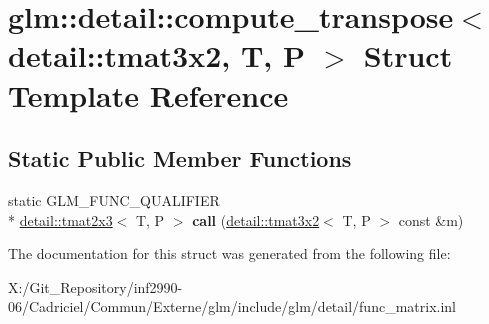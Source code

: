 \hypertarget{structglm_1_1detail_1_1compute__transpose_3_01detail_1_1tmat3x2_00_01_t_00_01_p_01_4}{\section{glm\-:\-:detail\-:\-:compute\-\_\-transpose$<$ detail\-:\-:tmat3x2, T, P $>$ Struct Template Reference}
\label{structglm_1_1detail_1_1compute__transpose_3_01detail_1_1tmat3x2_00_01_t_00_01_p_01_4}
}
\subsection*{Static Public Member Functions}
\begin{DoxyCompactItemize}
\item 
\hypertarget{structglm_1_1detail_1_1compute__transpose_3_01detail_1_1tmat3x2_00_01_t_00_01_p_01_4_a0a30f21e987d479af32a28eb6aeb5def}{static G\-L\-M\-\_\-\-F\-U\-N\-C\-\_\-\-Q\-U\-A\-L\-I\-F\-I\-E\-R \\*
\hyperlink{structglm_1_1detail_1_1tmat2x3}{detail\-::tmat2x3}$<$ T, P $>$ {\bfseries call} (\hyperlink{structglm_1_1detail_1_1tmat3x2}{detail\-::tmat3x2}$<$ T, P $>$ const \&m)}\label{structglm_1_1detail_1_1compute__transpose_3_01detail_1_1tmat3x2_00_01_t_00_01_p_01_4_a0a30f21e987d479af32a28eb6aeb5def}

\end{DoxyCompactItemize}


The documentation for this struct was generated from the following file\-:\begin{DoxyCompactItemize}
\item 
X\-:/\-Git\-\_\-\-Repository/inf2990-\/06/\-Cadriciel/\-Commun/\-Externe/glm/include/glm/detail/func\-\_\-matrix.\-inl\end{DoxyCompactItemize}
